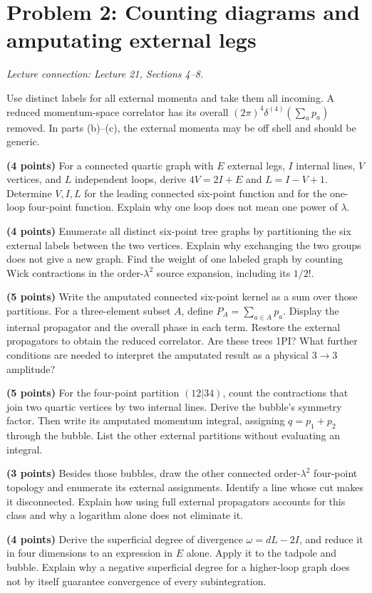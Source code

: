 \documentclass[11pt]{article}
\newcommand{\problem}[2]{\clearpage\section*{\color{qftblue}Problem #1: #2}}
\newcommand{\connection}[1]{{\small\textit{Lecture connection: #1}\par}\medskip}
\begin{document}
\problem{2}{Counting diagrams and amputating external legs}
\connection{Lecture 21, Sections 4--8.}
Use distinct labels for all external momenta and take them all incoming.
A reduced momentum-space correlator has its overall
\((2\pi)^4\delta^{(4)}(\sum_a p_a)\) removed. In parts (b)--(c), the
external momenta may be off shell and should be generic.
\begin{parts}
\item \textbf{(4 points)} For a connected quartic graph with \(E\)
external legs, \(I\) internal lines, \(V\) vertices, and \(L\)
independent loops, derive
\(4V=2I+E\) and \(L=I-V+1\). Determine \(V,I,L\) for the leading
connected six-point function and for the one-loop four-point function.
Explain why one loop does not mean one power of \(\lambda\).

\item \textbf{(4 points)} Enumerate all distinct six-point tree graphs
by partitioning the six external labels between the two vertices.
Explain why exchanging the two groups does not give a new graph.
Find the weight of one labeled graph by counting Wick contractions
in the order-\(\lambda^2\) source expansion, including its \(1/2!\).

\item \textbf{(5 points)} Write the amputated connected six-point
kernel as a sum over those partitions. For a three-element subset
\(A\), define \(P_A=\sum_{a\in A}p_a\). Display the internal
propagator and the overall phase in each term. Restore the external
propagators to obtain the reduced correlator. Are these trees 1PI?
What further conditions are needed to interpret the amputated result
as a physical \(3\to3\) amplitude?

\item \textbf{(5 points)} For the four-point partition \((12|34)\),
count the contractions that join two quartic vertices by two internal
lines. Derive the bubble's symmetry factor. Then write its amputated
momentum integral, assigning \(q=p_1+p_2\) through the bubble.
List the other external partitions without evaluating an integral.

\item \textbf{(3 points)} Besides those bubbles, draw the other
connected order-\(\lambda^2\) four-point topology and enumerate its
external assignments. Identify a line whose cut makes it disconnected.
Explain how using full external propagators accounts for this class
and why a logarithm alone does not eliminate it.

\item \textbf{(4 points)} Derive the superficial degree of divergence
\(\omega=dL-2I\), and reduce it in four dimensions to an expression
in \(E\) alone. Apply it to the tadpole and bubble. Explain why a
negative superficial degree for a higher-loop graph does not by
itself guarantee convergence of every subintegration.
\end{parts}
\end{document}
